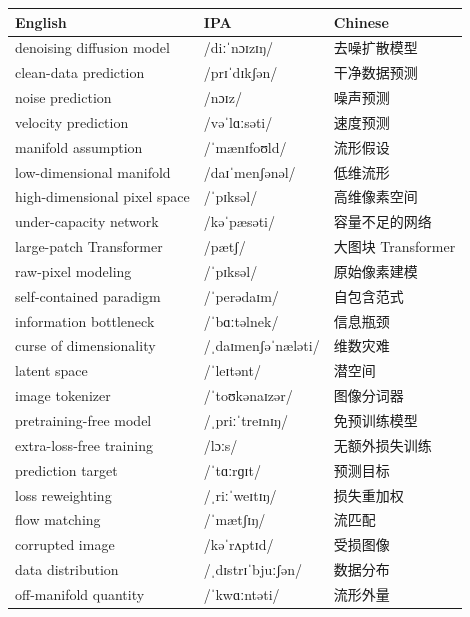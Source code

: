 \documentclass[UTF8,12pt,a4paper]{ctexart}
\providecommand{\zh}[1]{#1}
\begin{document}
\begin{tabular*}{\textwidth}{@{\extracolsep{\fill}}lll@{}}
\toprule
\textbf{English} & \textbf{IPA} & \textbf{Chinese} \\
\midrule
denoising diffusion model & {\ipafont /diːˈnɔɪzɪŋ/} & \zh{去噪扩散模型} \\
clean-data prediction & {\ipafont /prɪˈdɪkʃən/} & \zh{干净数据预测} \\
noise prediction & {\ipafont /nɔɪz/} & \zh{噪声预测} \\
velocity prediction & {\ipafont /vəˈlɑːsəti/} & \zh{速度预测} \\
manifold assumption & {\ipafont /ˈmænɪfoʊld/} & \zh{流形假设} \\
low-dimensional manifold & {\ipafont /daɪˈmenʃənəl/} & \zh{低维流形} \\
high-dimensional pixel space & {\ipafont /ˈpɪksəl/} & \zh{高维像素空间} \\
under-capacity network & {\ipafont /kəˈpæsəti/} & \zh{容量不足的网络} \\
large-patch Transformer & {\ipafont /pætʃ/} & \zh{大图块 Transformer} \\
raw-pixel modeling & {\ipafont /ˈpɪksəl/} & \zh{原始像素建模} \\
self-contained paradigm & {\ipafont /ˈperədaɪm/} & \zh{自包含范式} \\
information bottleneck & {\ipafont /ˈbɑːtəlnek/} & \zh{信息瓶颈} \\
curse of dimensionality & {\ipafont /ˌdaɪmenʃəˈnæləti/} & \zh{维数灾难} \\
latent space & {\ipafont /ˈleɪtənt/} & \zh{潜空间} \\
image tokenizer & {\ipafont /ˈtoʊkənaɪzər/} & \zh{图像分词器} \\
pretraining-free model & {\ipafont /ˌpriːˈtreɪnɪŋ/} & \zh{免预训练模型} \\
extra-loss-free training & {\ipafont /lɔːs/} & \zh{无额外损失训练} \\
prediction target & {\ipafont /ˈtɑːrɡɪt/} & \zh{预测目标} \\
loss reweighting & {\ipafont /ˌriːˈweɪtɪŋ/} & \zh{损失重加权} \\
flow matching & {\ipafont /ˈmætʃɪŋ/} & \zh{流匹配} \\
corrupted image & {\ipafont /kəˈrʌptɪd/} & \zh{受损图像} \\
data distribution & {\ipafont /ˌdɪstrɪˈbjuːʃən/} & \zh{数据分布} \\
off-manifold quantity & {\ipafont /ˈkwɑːntəti/} & \zh{流形外量} \\

\end{tabular*}
\end{document}
